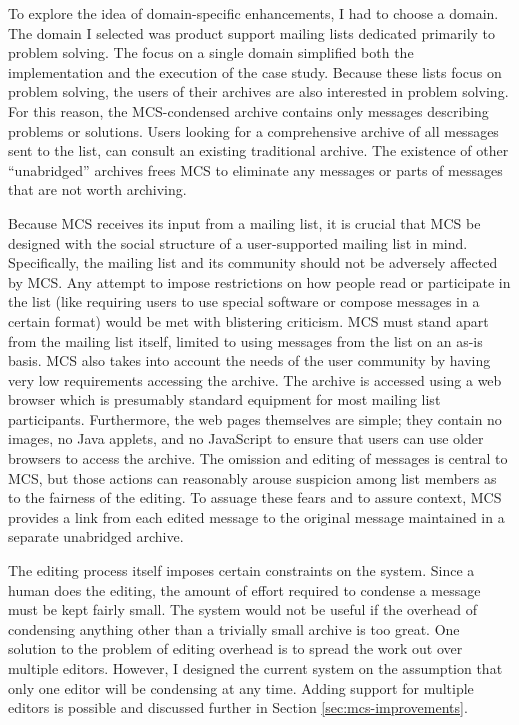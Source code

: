 To explore the idea of domain-specific enhancements, I had to choose a domain.
The domain I selected was product support mailing lists dedicated primarily to
problem solving. The focus on a single domain simplified both the
implementation and the execution of the case study. Because these lists focus
on problem solving, the users of their archives are also interested in problem
solving. For this reason, the MCS-condensed archive contains only messages
describing problems or solutions. Users looking for a comprehensive archive of
all messages sent to the list, can consult an existing traditional archive.
The existence of other ``unabridged'' archives frees MCS to eliminate any
messages or parts of messages that are not worth archiving.

Because MCS receives its input from a mailing list, it is crucial that MCS be
designed with the social structure of a user-supported mailing list in mind.
Specifically, the mailing list and its community should not be adversely
affected by MCS. Any attempt to impose restrictions on how people read or
participate in the list (like requiring users to use special software or
compose messages in a certain format) would be met with blistering criticism.
MCS must stand apart from the mailing list itself, limited to using messages
from the list on an as-is basis. MCS also takes into account the needs of the
user community by having very low requirements accessing the archive. The
archive is accessed using a web browser which is presumably standard equipment
for most mailing list participants. Furthermore, the web pages themselves are
simple; they contain no images, no Java applets, and no JavaScript to ensure
that users can use older browsers to access the archive. The omission and
editing of messages is central to MCS, but those actions can reasonably arouse
suspicion among list members as to the fairness of the editing. To assuage
these fears and to assure context, MCS provides a link from each edited message
to the original message maintained in a separate unabridged archive.

The editing process itself imposes certain constraints on the system. Since a
human does the editing, the amount of effort required to condense a message
must be kept fairly small. The system would not be useful if the overhead of
condensing anything other than a trivially small archive is too great. One
solution to the problem of editing overhead is to spread the work out over
multiple editors. However, I designed the current system on the assumption that
only one editor will be condensing at any time. Adding support for multiple
editors is possible and discussed further in Section
\ref{sec:mcs-improvements}.

